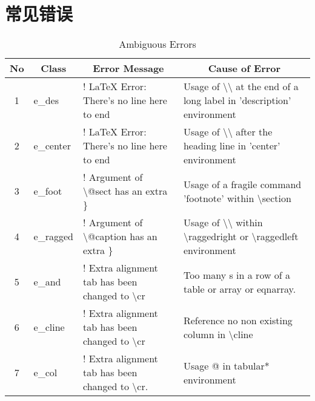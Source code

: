 \documentclass[cn,10pt,math=newtx,citestyle=gb7714-2015,bibstyle=gb7714-2015]{elegantbook}
\begin{document}
\section{常见错误}

\begin{sidewaystable}
	\centering
	\caption{Ambiguous Errors}
	\begin{tabular}{|c|l|l|l|} 
		\hline
		No & \multicolumn{1}{c|}{Class} & \multicolumn{1}{c|}{Error Message}                            & \multicolumn{1}{c|}{Cause of Error}                                                                                          \\ 
		\hline
		1  & e\_des                     & ! LaTeX Error: There's no line here to end                    & Usage of \textbackslash{}\textbackslash{} at the end of a long label in 'description' environment                            \\ 
		\hline
		2  & e\_center                  & ! LaTeX Error: There's no line here to end                    & Usage of \textbackslash{}\textbackslash{} after the heading line in 'center' environment                                     \\ 
		\hline
		3  & e\_foot                    & ! Argument of \textbackslash{}@sect has an extra \}           & Usage of a fragile command 'footnote' within \textbackslash{}section                                                         \\ 
		\hline
		4  & e\_ragged                  & ! Argument of \textbackslash{}@caption has an extra \}        & Usage of \textbackslash{}\textbackslash{} within \textbackslash{}raggedright or \textbackslash{}raggedleft environment       \\ 
		\hline
		5  & e\_and                     & ! Extra alignment tab has been changed to \textbackslash{}cr  & Too many s in a row of a table or array or eqnarray.                                                                         \\ 
		\hline
		6  & e\_cline                   & ! Extra alignment tab has been changed to \textbackslash{}cr  & Reference no non existing column in \textbackslash{}cline                                                                    \\ 
		\hline
		7  & e\_col                     & ! Extra alignment tab has been changed to \textbackslash{}cr. & Usage @ in tabular* environment                                                                                              \\ 

\end{tabular}
\end{sidewaystable}
\end{document}
